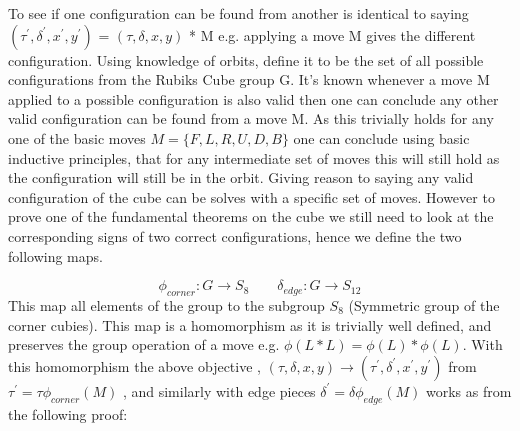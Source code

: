 \documentclass{article}
\begin{document}

To see if one configuration can be found from another is identical to saying $(\tau^{'} ,\delta^{'} , x^{'} , y^{'} )$ = $(\tau,\delta, x, y)$ * M e.g. applying a move M gives the different configuration. Using knowledge of orbits, define it to be the set of all possible configurations from the Rubiks Cube group G. It's known whenever a move M applied to a possible configuration is also valid then one can conclude any other valid configuration can be found from a move M. As this trivially holds for any one of the basic moves $M= \{{F,L,R,U,D,B}\}$ one can conclude using basic inductive principles, that for any intermediate set of moves this will still hold as the configuration will still be in the orbit. Giving reason to saying any valid configuration of the cube can be solves with a specific set of moves. However to prove one of the fundamental theorems on the cube we still need to look at the corresponding signs of two correct configurations, hence we define the two following maps. 


\begin{equation}\label{onto}
\phi_{corner}: G \rightarrow S_{8}\quad \quad 
\delta_{edge}: G \rightarrow S_{12}
\end{equation}
This map all elements of the group to the subgroup $S_{8}$ (Symmetric group of the corner cubies). This map is a homomorphism as it is trivially well defined, and preserves the group operation of a move e.g. $\phi (L*L) = \phi (L) * \phi(L)$. With this homomorphism the above objective , $(\tau,\delta, x, y) \longrightarrow (\tau^{'},\delta^{'}, x^{'}, y^{'})$ from $\tau^{'} = \tau\phi_{corner}(M) $ , and similarly with edge pieces $\delta^{'} = \delta\phi_{edge}(M) $ works as from the following proof:
\end{document}
